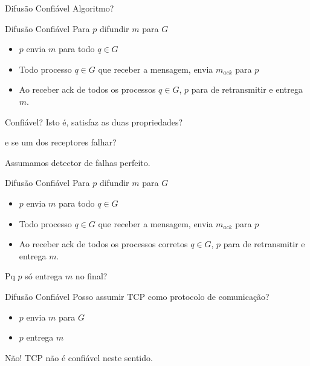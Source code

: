 \begin{frame}{Difusão Confiável}
Algoritmo?
\end{frame}


\begin{frame}{Difusão Confiável}
Para $p$ difundir $m$ para $G$
\begin{itemize}
\item $p$ envia $m$ para todo $q \in G$
\item Todo processo $q\in G$ que receber a mensagem, envia $m_{ack}$ para $p$
\item Ao receber ack de todos os processos $q \in G$, $p$ para de retransmitir e entrega $m$.
\end{itemize}

\pause Confiável? Isto é, satisfaz as duas propriedades?

\pause e se um dos receptores falhar?

\pause Assumamos detector de falhas perfeito.
\end{frame}

\begin{frame}{Difusão Confiável}
Para $p$ difundir $m$ para $G$
\begin{itemize}
	\item $p$ envia $m$ para todo $q \in G$
	\item Todo processo $q\in G$ que receber a mensagem, envia $m_{ack}$ para $p$
	\item Ao receber ack de todos os processos \alert{corretos} $q \in G$, $p$ para de retransmitir e entrega $m$.
\end{itemize}

\pause Pq $p$ só entrega $m$ no final?
\end{frame}


\begin{frame}{Difusão Confiável}
Posso assumir TCP como protocolo de comunicação?

\begin{itemize}
	\item $p$ envia $m$ para $G$
	\item $p$ entrega $m$
\end{itemize}

\pause Não! TCP não é confiável neste sentido.
\end{frame}

